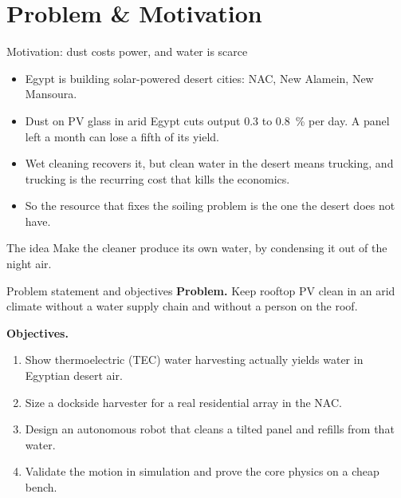 \documentclass[aspectratio=169,10pt]{beamer}
\begin{document}
\section{Problem \& Motivation}
\begin{frame}{Motivation: dust costs power, and water is scarce}
  \begin{itemize}\setlength\itemsep{0.5em}
    \item Egypt is building solar-powered desert cities: NAC, New Alamein, New Mansoura.
    \item Dust on PV glass in arid Egypt cuts output \SI{0.3}{} to \SI{0.8}{\percent} per day. A panel left a month can lose a fifth of its yield.
    \item Wet cleaning recovers it, but clean water in the desert means trucking, and trucking is the recurring cost that kills the economics.
    \item So the resource that fixes the soiling problem is the one the desert does not have.
  \end{itemize}
  \vspace{0.4em}
  \begin{block}{The idea}
    Make the cleaner produce its own water, by condensing it out of the night air.
  \end{block}
\end{frame}

\begin{frame}{Problem statement and objectives}
  \textbf{Problem.} Keep rooftop PV clean in an arid climate without a water supply chain and without a person on the roof.
  \vspace{0.6em}

  \textbf{Objectives.}
  \begin{enumerate}\setlength\itemsep{0.4em}
    \item Show thermoelectric (TEC) water harvesting actually yields water in Egyptian desert air.
    \item Size a dockside harvester for a real residential array in the NAC.
    \item Design an autonomous robot that cleans a tilted panel and refills from that water.
    \item Validate the motion in simulation and prove the core physics on a cheap bench.
  \end{enumerate}
\end{frame}
\end{document}
